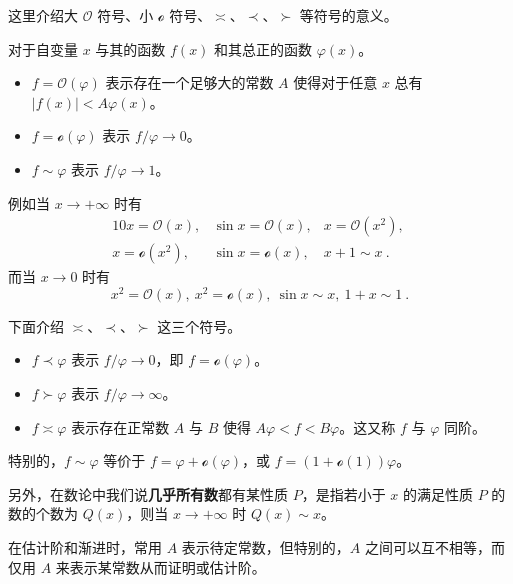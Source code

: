 
这里介绍大 $\mathcal O$ 符号、小 $\mathcal o$ 符号、$\asymp$、$\prec$、$\succ$ 等符号的意义。

对于自变量 $x$ 与其的函数 $f(x)$ 和其总正的函数 $\varphi(x)$。
\begin{itemize}
\item $f=\mathcal O(\varphi)$ 表示存在一个足够大的常数 $A$ 使得对于任意 $x$ 总有 $|f(x)| < A \varphi(x)$。
\item $f = \mathcal o(\varphi)$ 表示 $f/\varphi \rightarrow 0$。
\item $f \sim \varphi$ 表示 $f / \varphi \rightarrow 1$。
\end{itemize}

例如当 $x \rightarrow +\infty$ 时有
\begin{equation}
\begin{matrix}
10x = \mathcal O(x), &\sin x = \mathcal O(x), &x = \mathcal O(x^2), ~\\
x = \mathcal o(x^2), &\sin x = \mathcal o(x), &x + 1 \sim x ~.
\end{matrix}
\end{equation}
而当 $x \rightarrow 0$ 时有
\begin{equation}
x^2 = \mathcal O(x), ~ x^2 = \mathcal o(x), ~ \sin x \sim x , ~ 1+x \sim 1 ~.
\end{equation}

下面介绍 $\asymp$、$\prec$、$\succ$ 这三个符号。
\begin{itemize}
\item $f \prec \varphi$ 表示 $f/\varphi \rightarrow 0$，即 $f = \mathcal o(\varphi)$。
\item $f \succ \varphi$ 表示 $f/\varphi \rightarrow \infty$。
\item $f \asymp \varphi$ 表示存在正常数 $A$ 与 $B$ 使得 $A\varphi < f < B \varphi$。这又称 $f$ 与 $\varphi$ 同阶。
\end{itemize}

特别的，$f \sim \varphi$ 等价于 $f = \varphi + \mathcal o(\varphi)$，或 $f = (1 + \mathcal o(1))\varphi$。

另外，在数论中我们说\textbf{几乎所有数}都有某性质 $P$，是指若小于 $x$ 的满足性质 $P$ 的数的个数为 $Q(x)$，则当 $x \rightarrow +\infty$ 时 $Q(x) \sim x$。

在估计阶和渐进时，常用 $A$ 表示待定常数，但特别的，$A$ 之间可以互不相等，而仅用 $A$ 来表示某常数从而证明或估计阶。